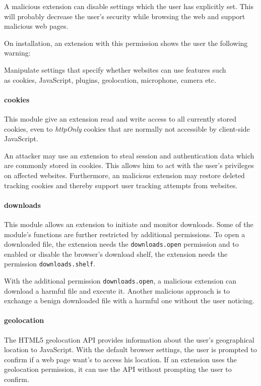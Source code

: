 	A malicious extension can disable settings which the user has explicitly set. This will probably decrease the user's security while browsing the web and support malicious web pages.
	
	On installation, an extension with this permission shows the user the following warning:
	\begin{permissionwarning}
		Manipulate settings that specify whether websites can use features such\\as cookies, JavaScript, plugins, geolocation, microphone, camera etc.
	\end{permissionwarning}
	
\paragraph{cookies} 
	This module give an extension read and write access to all currently stored cookies, even to \textit{httpOnly} cookies that are normally not accessible by client-side JavaScript.
	
	An attacker may use an extension to steal session and authentication data which are commonly stored in cookies. This allows him to act with the user's privileges on affected websites. Furthermore, an malicious extension may restore deleted tracking cookies and thereby support user tracking attempts from websites.
	
\paragraph{downloads} 
	This module allows an extension to initiate and monitor downloads. Some of the module's functions are further restricted by additional permissions. To open a downloaded file, the extension needs the \texttt{downloads.open} permission and to enabled or disable the browser's download shelf, the extension needs the permission \texttt{downloads.shelf}.  
	
	With the additional permission \texttt{downloads.open}, a malicious extension can download a harmful file and execute it. Another malicious approach is to exchange a benign downloaded file with a harmful one without the user noticing. 
	
\paragraph{geolocation}
	The HTML5 geolocation API provides information about the user's geographical location to JavaScript. With the default browser settings, the user is prompted to confirm if a web page want's to access his location. If an extension uses the geolocation permission, it can use the API without prompting the user to confirm.
	
